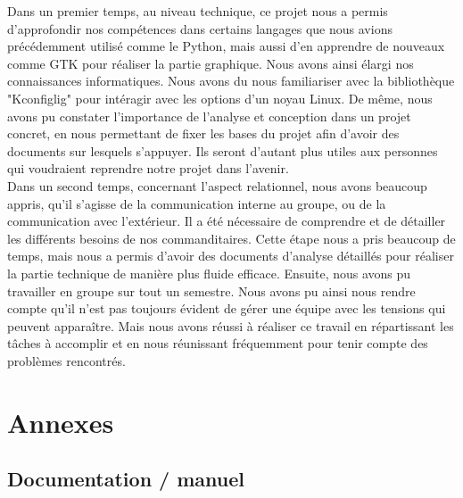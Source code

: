 \documentclass[16pts]{report}
\begin{document}
Dans un premier temps, au niveau technique, ce projet nous a permis 
d'approfondir nos compétences dans certains langages que nous avions 
précédemment utilisé comme le Python, mais aussi d'en apprendre de 
nouveaux comme GTK pour réaliser la partie graphique. Nous avons ainsi 
élargi nos connaissances informatiques. Nous avons du nous familiariser 
avec la bibliothèque "Kconfiglig" pour intéragir avec les options d'un 
noyau Linux. De même, nous avons pu constater l'importance de l'analyse 
et conception dans un projet concret, en nous permettant de fixer les bases 
du projet afin d'avoir des documents sur lesquels s'appuyer. Ils seront 
d'autant plus utiles aux personnes qui voudraient reprendre notre projet 
dans l'avenir.\\

Dans un second temps, concernant l'aspect relationnel, nous avons beaucoup 
appris, qu'il s'agisse de la communication interne au groupe, ou de la 
communication avec l'extérieur. Il a été nécessaire de comprendre et de 
détailler les différents besoins de nos commanditaires. Cette étape nous 
a pris beaucoup de temps, mais nous a permis d'avoir des documents d'analyse 
détaillés pour réaliser la partie technique de manière plus fluide efficace. 
Ensuite, nous avons pu travailler en groupe sur tout un semestre. Nous 
avons pu ainsi nous rendre compte qu'il n'est pas toujours évident de gérer 
une équipe avec les tensions qui peuvent apparaître. Mais nous avons réussi à 
réaliser ce travail en répartissant les tâches à accomplir et en nous 
réunissant fréquemment pour tenir compte des problèmes rencontrés.\\


\chapter{Annexes}
\label{cha:Annexes}
    \section{Documentation / manuel}
    \label{sec:Documentation / manuel}


\end{document}
